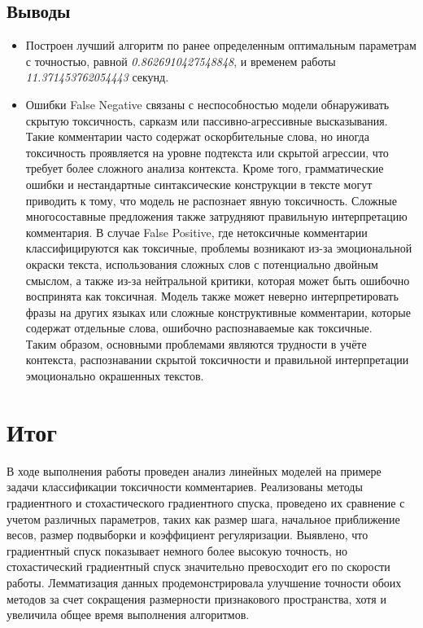 \documentclass[14pt]{extarticle}
\begin{document}
\subsection{Выводы}
\begin{itemize}
    \item Построен лучший алгоритм по ранее определенным оптимальным параметрам с точностью, равной  \textit{0.8626910427548848}, и временем работы \textit{11.371453762054443} секунд.
    \item Ошибки False Negative связаны с неспособностью модели обнаруживать скрытую токсичность, сарказм или пассивно-агрессивные высказывания. Такие комментарии часто содержат оскорбительные слова, но иногда токсичность проявляется на уровне подтекста или скрытой агрессии, что требует более сложного анализа контекста. Кроме того, грамматические ошибки и нестандартные синтаксические конструкции в тексте могут приводить к тому, что модель не распознает явную токсичность. Сложные многосоставные предложения также затрудняют правильную интерпретацию комментария. В случае False Positive, где нетоксичные комментарии классифицируются как токсичные, проблемы возникают из-за эмоциональной окраски текста, использования сложных слов с потенциально двойным смыслом, а также из-за нейтральной критики, которая может быть ошибочно воспринята как токсичная. Модель также может неверно интерпретировать фразы на других языках или сложные конструктивные комментарии, которые содержат отдельные слова, ошибочно распознаваемые как токсичные. \\ Таким образом, основными проблемами являются трудности в учёте контекста, распознавании скрытой токсичности и правильной интерпретации эмоционально окрашенных текстов.
\end{itemize}


\section{Итог}

В ходе выполнения работы проведен анализ линейных моделей на примере задачи классификации токсичности комментариев. Реализованы методы градиентного и стохастического градиентного спуска, проведено их сравнение с учетом различных параметров, таких как размер шага, начальное приближение весов, размер подвыборки и коэффициент регуляризации. Выявлено, что градиентный спуск показывает немного более высокую точность, но стохастический градиентный спуск значительно превосходит его по скорости работы. Лемматизация данных продемонстрировала улучшение точности обоих методов за счет сокращения размерности признакового пространства, хотя и увеличила общее время выполнения алгоритмов.
\end{document}
